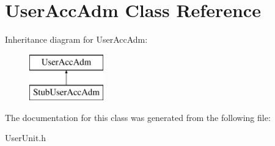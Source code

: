 \hypertarget{classUserAccAdm}{\section{User\-Acc\-Adm Class Reference}
\label{dd/d35/classUserAccAdm}
}
Inheritance diagram for User\-Acc\-Adm\-:\begin{figure}[H]
\begin{center}
\leavevmode
\includegraphics[height=2.000000cm]{dd/d35/classUserAccAdm}
\end{center}
\end{figure}


The documentation for this class was generated from the following file\-:\begin{DoxyCompactItemize}
\item 
User\-Unit.\-h\end{DoxyCompactItemize}
